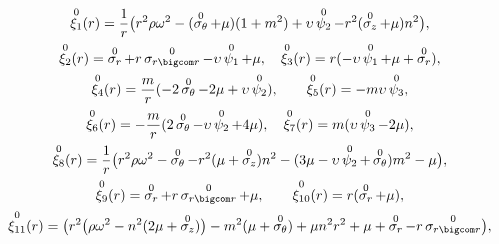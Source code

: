\begin{gather*} 

\mathop{\xi_1}\limits^{0}(r)=\frac{1}{r}\bigl(r^2\rho\omega^2-(\mathop{\sigma_{\theta}}\limits^{0}+\mu)(1+m^2)+\upsilon  \mathop{\psi_2}\limits^{0}-r^2(\mathop{\sigma_z}\limits^{0}+\mu )n^2\bigr), %

\\ 

\mathop{\xi_2}\limits^{0}(r)=\mathop{\sigma_r}\limits^{0}+r\mathop{\sigma_{r \bigcom r}}\limits^{0}-\upsilon  \mathop{\psi_1}\limits^{0}+\mu, \quad  

\mathop{\xi_3}\limits^{0}(r)=r (-\upsilon  \mathop{\psi_1}\limits^{0}+\mu+\mathop{\sigma_r}\limits^{0} ),%

\\

\mathop{\xi_4}\limits^{0}(r)=\frac{m}{r} (-2\mathop{\sigma_{\theta}}\limits^{0}-2\mu+\upsilon  \mathop{\psi_2}\limits^{0} ),\qquad  

\mathop{\xi_5}\limits^{0}(r)=-m\upsilon  \mathop{\psi_3}\limits^{0}, %

\\

\mathop{\xi_6}\limits^{0}(r)=-\frac{m}{r}(2\mathop{\sigma_{\theta}}\limits^{0}-\upsilon  \mathop{\psi_2}\limits^{0}+4\mu ),\quad 

\mathop{\xi_7}\limits^{0}(r)=m (\upsilon  \mathop{\psi_3}\limits^{0}-2\mu ),%

\\

\mathop{\xi_8}\limits^{0}(r)=\frac{1}{r}\bigl(r^2\rho\omega^2-\mathop{\sigma_{\theta}}\limits^{0}-r^2 (\mu+\mathop{\sigma_z}\limits^{0})n^2-(3\mu-\upsilon  \mathop{\psi_2}\limits^{0}+\mathop{\sigma_{\theta}}\limits^{0})m^2-\mu\bigr),%

\\

\mathop{\xi_9}\limits^{0}(r)=\mathop{\sigma_r}\limits^{0}+r\mathop{\sigma_{r \bigcom r}}\limits^{0}+\mu, \qquad  

\mathop{\xi_{10}}\limits^{0}(r)=r(\mathop{\sigma_r}\limits^{0}+\mu),%

\\

\mathop{\xi_{11}}\limits^{0}(r)=\bigl(r^2\bigl(\rho\omega^2-n^2 (2\mu+\mathop{\sigma_z}\limits^{0})\bigr)-m^2 (\mu+\mathop{\sigma_{\theta}}\limits^{0})+\mu n^2r^2+\mu+\mathop{\sigma_r}\limits^{0}-r\mathop{\sigma_{r \bigcom r}}\limits^{0}\bigr),%


\end{gather*}
